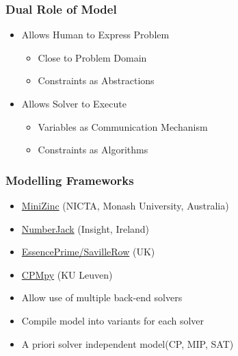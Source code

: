 \begin{frame}
\frametitle{Dual Role of Model}
\begin{itemize}
\item Allows Human to Express Problem
\begin{itemize}
\item Close to Problem Domain
\item Constraints as Abstractions
\end{itemize}
\item Allows Solver to Execute
\begin{itemize}
\item Variables as Communication Mechanism
\item Constraints as Algorithms
\end{itemize}
\end{itemize}
\end{frame}

\begin{frame}
\frametitle{Modelling Frameworks}
\begin{itemize}
\item \href{https://www.minizinc.org/}{MiniZinc} (NICTA, Monash University, Australia)
\item \href{https://github.com/eomahony/Numberjack}{NumberJack} (Insight, Ireland) 
\item \href{https://www-users.york.ac.uk/peter.nightingale/savilerow//}{EssencePrime/SavilleRow} (UK) 
\item \href{https://cpmpy.readthedocs.io/en/latest/}{CPMpy} (KU Leuven)
\item Allow use of multiple back-end solvers
\item Compile model into variants for each solver
\item A priori solver independent model(CP, MIP, SAT)
\end{itemize}
\end{frame} 

